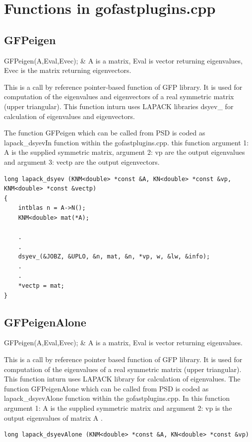 \documentclass{report}
\makeatletter
\newenvironment{conditions*}
  {\par\vspace{\abovedisplayskip}\noindent
   \tabularx{\columnwidth}{>{\ttfamily}l<{ \ttfamily ~~~ } @{\ttfamily} >{\raggedright\arraybackslash}X}}
  {\endtabularx\par\vspace{\belowdisplayskip}}
\makeatother
\begin{document}
\section{Functions in gofastplugins.cpp}

\subsection{GFPeigen}

\begin{conditions*}
GFPeigen(A,Eval,Evec); & {\ttfamily A} is a matrix, {\ttfamily Eval} is vector returning eigenvalues, {\ttfamily Evec} is the matrix returning eigenvectors.
\end{conditions*}
This is a call by reference pointer-based function of GFP library. It is used for computation of the eigenvalues and eigenvectors of a real symmetric matrix (upper triangular). This function inturn uses LAPACK libraries {\ttfamily dsyev\_} for calculation of eigenvalues and eigenvectors. 

The function {\ttfamily GFPeigen} which can be called from PSD is coded as {\ttfamily lapack\_dsyevIn} function within the gofastplugins.cpp.  this function argument 1: {\ttfamily A} is the supplied symmetric matrix, argument 2: {\ttfamily vp}  are the output eigenvalues and argument 3: {\ttfamily vectp}  are the output eigenvectors.
\begin{lstlisting}[language=PSD]
long lapack_dsyev (KNM<double> *const &A, KN<double> *const &vp, KNM<double> *const &vectp) 
{
	intblas n = A->N();
	KNM<double> mat(*A);
	
    .
    .
    dsyev_(&JOBZ, &UPLO, &n, mat, &n, *vp, w, &lw, &info);
    .
    .
    *vectp = mat;
}
\end{lstlisting}


\subsection{GFPeigenAlone}

\begin{conditions*}
GFPeigen(A,Eval,Evec); & {\ttfamily A} is a matrix, {\ttfamily Eval} is vector returning eigenvalues.
\end{conditions*}

This is a call by reference pointer based function of GFP library. It is used for computation of the eigenvalues of a real symmetric matrix (upper triangular). This function inturn uses LAPACK library for calculation of eigenvalues. The function {\ttfamily GFPeigenAlone} which can be called from PSD is coded as {\ttfamily lapack\_dsyevAlone} function within the gofastplugins.cpp. In this function argument 1: {\ttfamily A} is the supplied symmetric matrix and argument 2: {\ttfamily vp}  is the output eigenvalues of matrix {\ttfamily A} .
\begin{lstlisting}[language=PSD]
long lapack_dsyevAlone (KNM<double> *const &A, KN<double> *const &vp)
\end{lstlisting}
\end{document}
